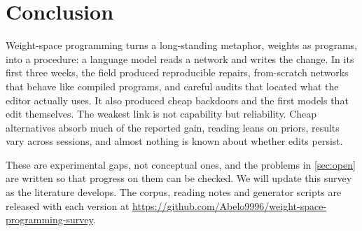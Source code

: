 \section{Conclusion}
\label{sec:conclusion}

Weight-space programming turns a long-standing metaphor, weights as programs, into a procedure: a language model reads a network and writes the change. In its first three weeks, the field produced reproducible repairs, from-scratch networks that behave like compiled programs, and careful audits that located what the editor actually uses. It also produced cheap backdoors and the first models that edit themselves. The weakest link is not capability but reliability. Cheap alternatives absorb much of the reported gain, reading leans on priors, results vary across sessions, and almost nothing is known about whether edits persist.

These are experimental gaps, not conceptual ones, and the problems in \cref{sec:open} are written so that progress on them can be checked. We will update this survey as the literature develops. The corpus, reading notes and generator scripts are released with each version at \url{https://github.com/Abelo9996/weight-space-programming-survey}.
